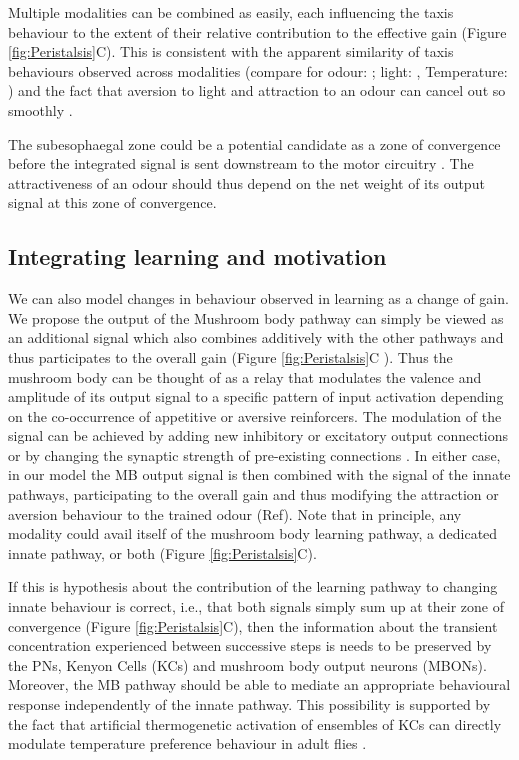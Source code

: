 \documentclass[11pt,a4paper]{article}
\begin{document}
Multiple modalities can be combined as easily, each influencing the taxis behaviour to the extent of their relative contribution to the effective gain (Figure \ref{fig:Peristalsis}C). This is consistent with the apparent similarity of taxis behaviours observed across modalities (compare for odour: \citep{gomez2011active}; light: \cite{kane2013sensorimotor},   Temperature: \cite{lahiri2011two}) and the fact that aversion to light and attraction to an odour can cancel out so smoothly \cite{bellmann2010optogenetically}. 

The subesophaegal zone could be a potential candidate as a zone of convergence before the integrated signal is sent downstream to the motor circuitry \cite{tastekin2015role}. The attractiveness of an odour should thus depend on the net weight of its output signal at this zone of convergence.  


\subsection{Integrating learning and motivation}
We can also model changes in behaviour observed in learning as a change of gain. We propose the output of the Mushroom body pathway \citep{gerber2004engram} can simply be viewed as an additional signal which also combines additively with the other pathways and thus participates to the overall gain (Figure \ref{fig:Peristalsis}C ). Thus the mushroom body can be thought of as a relay that modulates the valence and amplitude of its output signal to a specific pattern of input activation depending on the co-occurrence of appetitive or aversive reinforcers. The modulation of the signal can be achieved by adding new inhibitory or excitatory output connections or by changing the synaptic strength of pre-existing connections \citep{aso2014neuronal}. In either case, in our model the MB output signal is then combined with the signal of the innate pathways, participating to the overall gain and thus modifying the attraction or aversion behaviour to the trained odour (Ref). Note that in principle, any modality could avail itself of the mushroom body learning pathway, a dedicated innate pathway, or both (Figure \ref{fig:Peristalsis}C). 

If this is hypothesis about the contribution of the learning pathway to changing innate behaviour is correct, i.e., that both signals simply sum up at their zone of convergence (Figure \ref{fig:Peristalsis}C), then the information about the transient concentration experienced between successive steps is needs to be preserved by the PNs, Kenyon Cells (KCs) and mushroom body output neurons (MBONs). Moreover, the MB pathway should be able to mediate an appropriate behavioural response independently of the innate pathway. This possibility is supported by the fact that artificial thermogenetic activation of ensembles of KCs can directly modulate temperature preference behaviour in adult flies \citep{vasmer2014induction}. 
\end{document}
